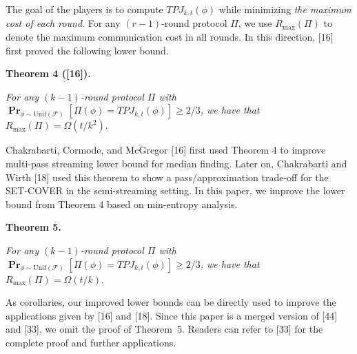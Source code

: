 \documentclass[10pt,a4paper]{article}
\begin{document}
The goal of the players is to compute $TPJ_{k,t}(\phi)$ while minimizing \emph{the maximum cost of each round}. For any $(r-1)$-round protocol $\Pi$, we use $R_{\max}(\Pi)$ to denote the maximum communication cost in all rounds. In this direction, [16] first proved the following lower bound.\par





\par\medskip\noindent\textbf{
\textbf{Theorem 4}\textbf{ }([16])\textbf{.}
}\par



\emph{For any $(k-1)$-round protocol $\Pi$ with
$\operatorname*{\mathbf{Pr}}_{\phi\sim\mathrm{Unif}(\mathcal{F})}[\Pi(\phi)=TPJ_{k,t}(\phi)]\geq 2/3$,
we have that $R_{\max}(\Pi)=\Omega(t/k^{2}).$}\par






Chakrabarti, Cormode, and McGregor [16] first used Theorem 4 to improve multi-pass streaming lower bound for median finding.
Later on, Chakrabarti and Wirth [18] used this theorem to show a pass/approximation trade-off for the SET-COVER in the semi-streaming setting. In this paper, we improve the lower bound from Theorem 4 based on min-entropy analysis.\par





\par\medskip\noindent\textbf{
\textbf{Theorem 5}\textbf{.}
}\par



\emph{For any $(k-1)$-round protocol $\Pi$ with $\operatorname*{\mathbf{Pr}}_{\phi\sim\mathrm{Unif}(\mathcal{F})}[\Pi(\phi)=TPJ_{k,t}(\phi)]\geq 2/3$,
we have that $R_{\max}(\Pi)=\Omega(t/k).$}\par






As corollaries, our improved lower bounds can be directly used to improve the applications given by [16] and [18]. Since this paper is a merged version of [44] and [33], we omit the proof of Theorem 5. Readers can refer to [33] for the complete proof and further applications.\par
\end{document}
